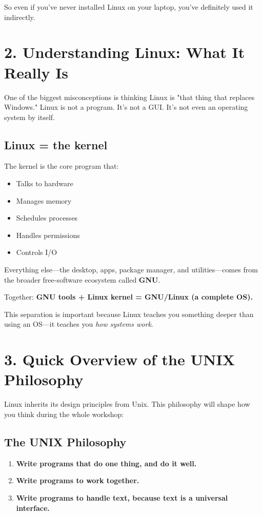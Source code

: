 \documentclass[12pt]{article}
\begin{document}
So even if you've never installed Linux on your laptop, you've definitely used it indirectly.

\section*{2. Understanding Linux: What It Really Is}

One of the biggest misconceptions is thinking Linux is "that thing that replaces Windows." Linux is not a program. It's not a GUI. It's not even an operating system by itself.

\subsection*{Linux = the kernel}

The kernel is the core program that:

\begin{itemize}
    \item Talks to hardware
    \item Manages memory
    \item Schedules processes
    \item Handles permissions
    \item Controls I/O
\end{itemize}

Everything else—the desktop, apps, package manager, and utilities—comes from the broader free-software ecosystem called \textbf{GNU}.

Together:
\textbf{GNU tools + Linux kernel = GNU/Linux (a complete OS).}

This separation is important because Linux teaches you something deeper than using an OS—it teaches you \textit{how systems work}.

\section*{3. Quick Overview of the UNIX Philosophy}

Linux inherits its design principles from Unix. This philosophy will shape how you think during the whole workshop:

\subsection*{The UNIX Philosophy}

\begin{enumerate}
    \item \textbf{Write programs that do one thing, and do it well.}
    \item \textbf{Write programs to work together.}
    \item \textbf{Write programs to handle text, because text is a universal interface.}
\end{enumerate}
\end{document}
